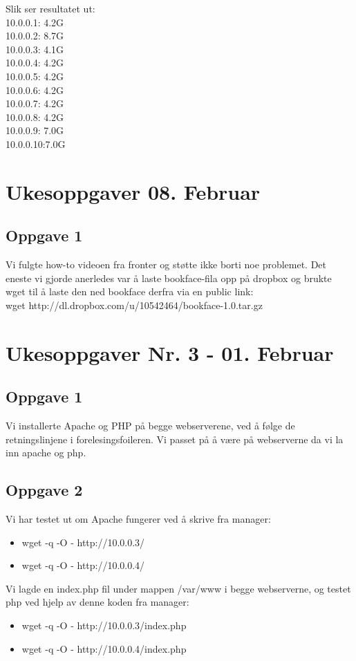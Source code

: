 \documentclass[a4paper, norsk, 12pt]{article}
\begin{document}
Slik ser resultatet ut:\\
10.0.0.1: 4.2G\\
10.0.0.2: 8.7G\\
10.0.0.3: 4.1G\\
10.0.0.4: 4.2G\\
10.0.0.5: 4.2G\\
10.0.0.6: 4.2G\\
10.0.0.7: 4.2G\\
10.0.0.8: 4.2G\\
10.0.0.9: 7.0G\\
10.0.0.10:7.0G

\section{Ukesoppgaver 08. Februar}

\subsection*{Oppgave 1}
Vi fulgte how-to videoen fra fronter og støtte ikke borti noe problemet. Det eneste vi gjorde anerledes var å laste bookface-fila opp på dropbox og brukte wget til å laste den ned bookface derfra via en public link:\\
 wget http://dl.dropbox.com/u/10542464/bookface-1.0.tar.gz



\section{Ukesoppgaver Nr. 3 - 01. Februar}
\subsection{Oppgave 1}
Vi installerte Apache og PHP på begge webserverene, ved å følge de retningslinjene i forelesingsfoileren. Vi passet på å være på webserverne da vi la inn apache og php.

\subsection{Oppgave 2}
Vi har testet ut om Apache fungerer ved å skrive fra manager:
\begin{itemize}
\item wget -q -O - http://10.0.0.3/
\item wget -q -O - http://10.0.0.4/
\end{itemize}
Vi lagde en index.php fil under mappen /var/www i begge webserverne, og testet php ved hjelp av denne koden fra manager:
\begin{itemize}
\item wget -q -O - http://10.0.0.3/index.php
\item wget -q -O - http://10.0.0.4/index.php
\end{itemize}
\end{document}
